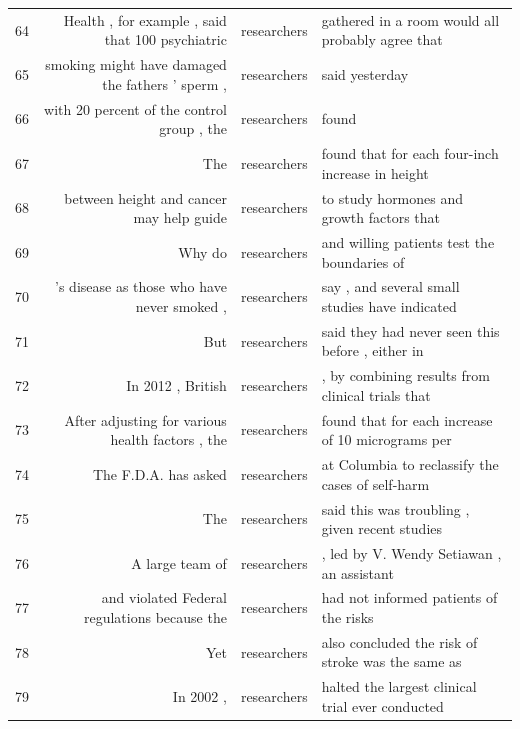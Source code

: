 {\begin{table}
\begin{tabular}{|lrcl|}
64 & Health , for example , said that 100 psychiatric   & researchers & gathered in a room would all probably agree that   \\
65 & smoking might have damaged the fathers ' sperm ,   & researchers & said yesterday                                     \\
66 & with 20 percent of the control group , the         & researchers & found                                              \\
67 & The                                                & researchers & found that for each four-inch increase in height   \\
68 & between height and cancer may help guide           & researchers & to study hormones and growth factors that          \\
69 & Why do                                             & researchers & and willing patients test the boundaries of        \\
70 & 's disease as those who have never smoked ,        & researchers & say , and several small studies have indicated     \\
71 & But                                                & researchers & said they had never seen this before , either in   \\
72 & In 2012 , British                                  & researchers & , by combining results from clinical trials that   \\
73 & After adjusting for various health factors , the   & researchers & found that for each increase of 10 micrograms per  \\
74 & The F.D.A. has asked                               & researchers & at Columbia to reclassify the cases of self-harm   \\
75 & The                                                & researchers & said this was troubling , given recent studies     \\
76 &  A large team of                                    & researchers & , led by V. Wendy Setiawan , an assistant          \\
77 &  and violated Federal regulations because the       & researchers & had not informed patients of the risks             \\
78 &  Yet                                                & researchers & also concluded the risk of stroke was the same as  \\
79 &  In 2002 ,                                          & researchers & halted the largest clinical trial ever conducted   \\

\end{tabular}
\end{table}}
